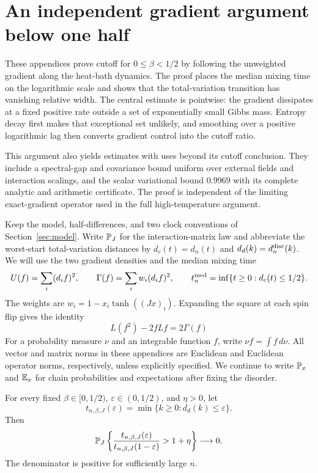 \section{An independent gradient argument below one half}
\label{sec:rcut-introduction}
These appendices prove cutoff for $0\le\beta<1/2$ by following the
unweighted gradient along the heat-bath dynamics. The proof places the
median mixing time on the logarithmic scale and shows that the
total-variation transition has vanishing relative width. The central
estimate is pointwise: the gradient dissipates at a fixed positive rate outside a set
of exponentially small Gibbs mass. Entropy decay first makes that
exceptional set unlikely, and smoothing over a positive logarithmic lag
then converts gradient control into the cutoff ratio.

This argument also yields estimates with uses beyond its cutoff
conclusion. They include a spectral-gap and covariance bound uniform over
external fields and interaction scalings, and the scalar variational
bound $0.9969$ with its complete analytic and arithmetic certificate.
The proof is independent of the limiting exact-gradient operator used in
the full high-temperature argument.

Keep the model, half-differences, and two clock conventions of
Section~\ref{sec:model}. Write $\P_J$ for the interaction-matrix law and
abbreviate the worst-start total-variation distances by
$d_c(t)=d_n(t)$ and $d_d(k)=d_n^{\rm disc}(k)$. We will use the two
gradient densities and the median mixing time
\[
 U(f)=\sum_i(d_i f)^2,\qquad
 \Gamma(f)=\sum_iw_i(d_i f)^2,\qquad
 t_n^{\rm med}=\inf\{t\ge0:d_c(t)\le1/2\}.
\]
The weights are $w_i=1-x_i\tanh((Jx)_i)$. Expanding the square at each
spin flip gives the identity
\begin{equation}
 L(f^2)-2fLf=2\Gamma(f)
 \label{rcut:eq:variance-density}
\end{equation}
For a probability measure $\nu$ and an integrable function $f$, write
$\nu f=\int f\,d\nu$.
All vector and matrix norms in these appendices are Euclidean and
Euclidean operator norms, respectively, unless explicitly specified.
We continue to write $\P_x$ and $\E_x$ for chain probabilities and
expectations after fixing the disorder.

\begin{theorem}\label{rcut:thm:main}
For every fixed $\beta\in[0,1/2)$, $\varepsilon\in(0,1/2)$, and
$\eta>0$, let
\[
 t_{n,\beta,J}(\varepsilon)=\min\{k\ge0:d_d(k)\le\varepsilon\}.
\]
Then
\[
 \P_J\left\{
 \frac{t_{n,\beta,J}(\varepsilon)}
 {t_{n,\beta,J}(1-\varepsilon)}>1+\eta\right\}\longrightarrow0.
\]
The denominator is positive for sufficiently large $n$.
\end{theorem}

